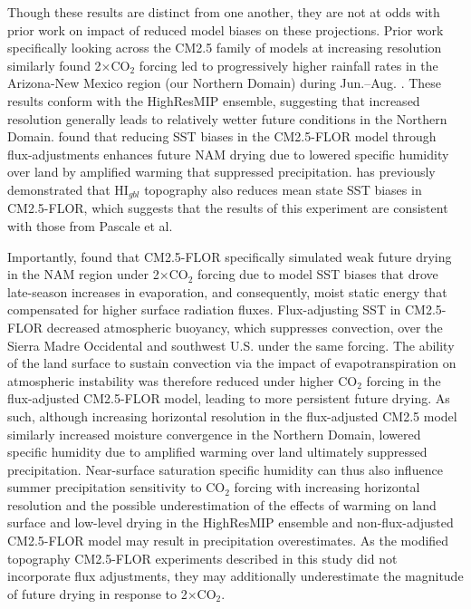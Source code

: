 \documentclass[draft]{agujournal2019}
\begin{document}
Though these results are distinct from one another, they are not at odds with prior work on impact of reduced model biases on these projections. Prior work specifically looking across the CM2.5 family of models at increasing resolution similarly found 2$\times$CO$_2$ forcing led to progressively higher rainfall rates in the Arizona-New Mexico region (our Northern Domain) during Jun.--Aug. \cite{van-der-wiel16jc}. These results conform with the HighResMIP ensemble, suggesting that increased resolution generally leads to relatively wetter future conditions in the Northern Domain.  found that reducing SST biases in the CM2.5-FLOR model through flux-adjustments enhances future NAM drying due to lowered specific humidity over land by amplified warming that suppressed precipitation.  has previously demonstrated that HI$_{gbl}$ topography also reduces mean state SST biases in CM2.5-FLOR, which suggests that the results of this experiment are consistent with those from Pascale et al. 

Importantly,  found that CM2.5-FLOR specifically simulated weak future drying in the NAM region under 2$\times$CO$_2$ forcing due to model SST biases that drove late-season increases in evaporation, and consequently, moist static energy that compensated for higher surface radiation fluxes. Flux-adjusting SST in CM2.5-FLOR decreased atmospheric buoyancy, which suppresses convection, over the Sierra Madre Occidental and southwest U.S. under the same forcing. The ability of the land surface to sustain convection via the impact of evapotranspiration on atmospheric instability was therefore reduced under higher CO$_{2}$ forcing in the flux-adjusted CM2.5-FLOR model, leading to more persistent future drying. As such, although increasing horizontal resolution in the flux-adjusted CM2.5 model similarly increased moisture convergence in the Northern Domain, lowered specific humidity due to amplified warming over land ultimately suppressed precipitation. Near-surface saturation specific humidity can thus also influence summer precipitation sensitivity to CO$_{2}$ forcing with increasing horizontal resolution \cite{pascale17ncc,pascale18jc} and the possible underestimation of the effects of warming on land surface and low-level drying in the HighResMIP ensemble and non-flux-adjusted CM2.5-FLOR model may result in precipitation overestimates. As the modified topography CM2.5-FLOR experiments described in this study did not incorporate flux adjustments, they may additionally underestimate the magnitude of future drying in response to 2$\times$CO$_2$.
\end{document}

